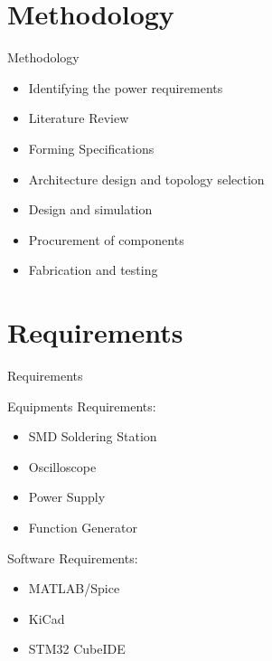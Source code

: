 \documentclass[aspectratio=169]{beamer}
\begin{document}
\section{Methodology}

	
	
	
	

\begin{frame}{Methodology}
		\begin{itemize}
			
			\item Identifying the power requirements
			\item Literature Review
			\item Forming Specifications
			\item Architecture design and topology selection
			\item Design and simulation
			\item Procurement of components
			\item Fabrication and testing
		
		\end{itemize} 
	
\end{frame}


\section{Requirements}
\begin{frame}{Requirements}
	\begin{minipage}{0.5\textwidth}
		Equipments Requirements:
		\begin{itemize}
			
			\item SMD Soldering Station
			\item Oscilloscope
			\item Power Supply
			\item Function Generator
		\end{itemize} 
	\end{minipage}
	\begin{minipage}{0.3\textwidth}
		Software Requirements:
		\begin{itemize}
			
			\item MATLAB/Spice
			\item KiCad
			\item STM32 CubeIDE
			
		\end{itemize} 
		
	\end{minipage}
\end{frame}
\end{document}

